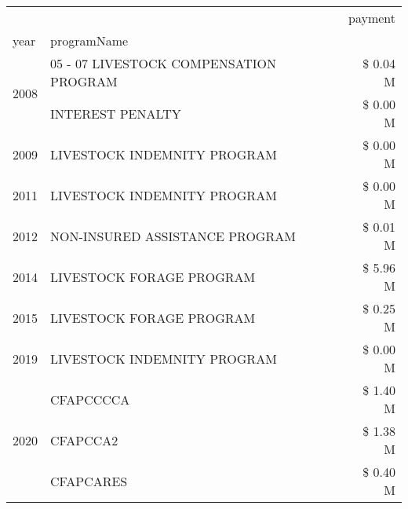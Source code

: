 \begin{tabular}{llr}
\toprule
 &  & payment \\
year & programName &  \\
\midrule
\multirow[t]{2}{*}{2008} & 05 - 07 LIVESTOCK COMPENSATION PROGRAM & \$ 0.04 M \\
 & INTEREST PENALTY & \$ 0.00 M \\
\cline{1-3}
2009 & LIVESTOCK INDEMNITY PROGRAM & \$ 0.00 M \\
\cline{1-3}
2011 & LIVESTOCK INDEMNITY PROGRAM & \$ 0.00 M \\
\cline{1-3}
2012 & NON-INSURED ASSISTANCE PROGRAM & \$ 0.01 M \\
\cline{1-3}
2014 & LIVESTOCK FORAGE PROGRAM & \$ 5.96 M \\
\cline{1-3}
2015 & LIVESTOCK FORAGE PROGRAM & \$ 0.25 M \\
\cline{1-3}
2019 & LIVESTOCK INDEMNITY PROGRAM & \$ 0.00 M \\
\cline{1-3}
\multirow[t]{3}{*}{2020} & CFAPCCCCA & \$ 1.40 M \\
 & CFAPCCA2 & \$ 1.38 M \\
 & CFAPCARES & \$ 0.40 M \\
\cline{1-3}
\bottomrule
\end{tabular}
